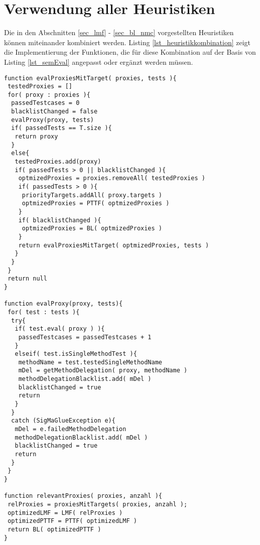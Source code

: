 \chapter{Verwendung aller Heuristiken}\label{app_semEvalMitAllenHeuristiken}
Die in den Abschnitten \ref{sec_lmf} - \ref{sec_bl_nmc} vorgestellten Heuristiken können miteinander kombiniert werden. Listing \ref{lst_heuristikkombination} zeigt die Implementierung der Funktionen, die für diese Kombination auf der Basis von Listing \ref{lst_semEval} angepasst oder ergänzt werden müssen.

\begin{lstlisting}[style = pseudo, caption = Kombination aller Heuristiken, captionpos = b, label = lst_heuristikkombination]
function evalProxiesMitTarget( proxies, tests ){
 testedProxies = []
 for( proxy : proxies ){
  passedTestcases = 0
  blacklistChanged = false
  evalProxy(proxy, tests)
  if( passedTests == T.size ){
   return proxy
  }
  else{
   testedProxies.add(proxy)
   if( passedTests > 0 || blacklistChanged ){
    optmizedProxies = proxies.removeAll( testedProxies )
    if( passedTests > 0 ){
     priorityTargets.addAll( proxy.targets )
     optmizedProxies = PTTF( optmizedProxies )	
    }
    if( blacklistChanged ){
     optmizedProxies = BL( optmizedProxies )	
    }
    return evalProxiesMitTarget( optmizedProxies, tests )
   }
  }
 }
 return null
}

function evalProxy(proxy, tests){
 for( test : tests ){
  try{
   if( test.eval( proxy ) ){
    passedTestcases = passedTestcases + 1
   }
   elseif( test.isSingleMethodTest ){
    methodName = test.testedSingleMethodName
    mDel = getMethodDelegation( proxy, methodName )
    methodDelegationBlacklist.add( mDel )
    blacklistChanged = true
    return
   }
  }
  catch (SigMaGlueException e){
   mDel = e.failedMethodDelegation
   methodDelegationBlacklist.add( mDel )
   blacklistChanged = true
   return
  } 
 }
}

function relevantProxies( proxies, anzahl ){
 relProxies = proxiesMitTargets( proxies, anzahl );
 optimizedLMF = LMF( relProxies )
 optimizedPTTF = PTTF( optimizedLMF )
 return BL( optimizedPTTF )
} 
\end{lstlisting}